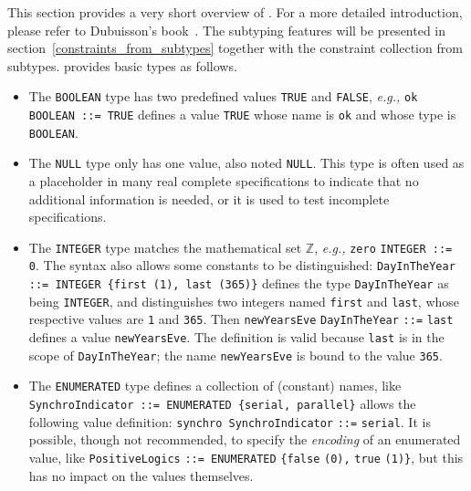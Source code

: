 
This section provides a very short overview of \ASN. For a more
detailed introduction, please refer to Dubuisson's
book~\cite{Dubuisson:2000}. The subtyping features will be presented
in section~\ref{constraints_from_subtypes} together with the
constraint collection from subtypes. \ASN provides basic types as
follows.

\begin{itemize}
 
  \item The \texttt{\small BOOLEAN} type has two predefined values
        \texttt{\small TRUE} and \texttt{\small FALSE},
        \emph{e.g.,} \texttt{ok} \texttt{\small BOOLEAN ::= TRUE} defines a
        value \texttt{\small TRUE} whose name is \texttt{ok} 
        and whose type is \texttt{\small BOOLEAN}.

  \item The \texttt{\small NULL} type only has one value, also noted
        \texttt{\small NULL}. This type is often used as a placeholder
        in many real complete specifications to indicate that no
        additional information is needed, or it is used to test
        incomplete specifications.

  \item The \texttt{\small INTEGER} type matches the mathematical set
    $\mathbb{Z}$, \emph{e.g.,} \texttt{zero} \texttt{\small INTEGER
    ::= 0}. The syntax also allows some constants to be distinguished:
    \texttt{\small DayIn\-The\-Year ::= INTEGER \{first (1), last
      (365)\}} defines the type \texttt{Day\-In\-The\-Year} as being
    \texttt{\small INTEGER}, and distinguishes two integers named
    \texttt{first} and \texttt{last}, whose respective values are
    \texttt{\small 1} and \texttt{\small 365}. Then
    \texttt{newYearsEve} \texttt{DayInTheYear} \texttt{\small ::=}
    \texttt{last} defines a value \texttt{newYearsEve}. The definition
    is valid because \texttt{last} is in the scope of
    \texttt{Day\-In\-The\-Year}; the name \texttt{newYearsEve} is
    bound to the value \texttt{\small 365}.

  \item The \texttt{\small ENUMERATED} type defines a collection
    of (constant) names, like \texttt{\small
      Synchro\-Indicator ::= ENUMERATED \{serial, parallel\}} allows
    the following value definition: \texttt{synchro
      Synchro\-Indi\-ca\-tor} \texttt{\small ::=} \texttt{serial}. It
    is possible, though not recommended, to specify the
    \emph{encoding} of an enumerated value, like
    \texttt{PositiveLogics} \texttt{\small ::= ENUMERATED}
    \verb+{+\texttt{false} \texttt{\small (0),} \texttt{true}
    \texttt{\small(1)}\verb+}+, but this has no impact on the values
    themselves.


\end{itemize}
